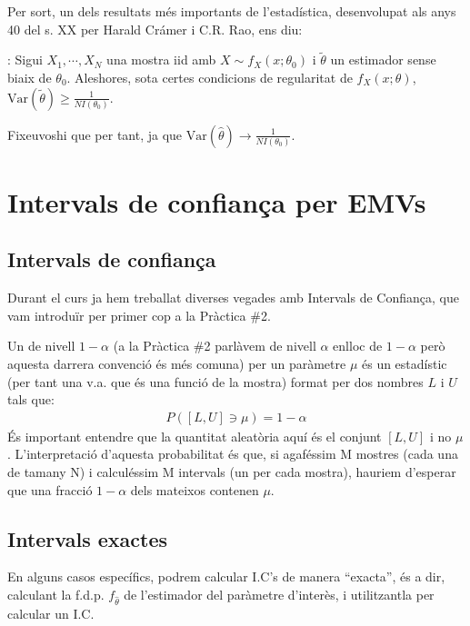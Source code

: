 \documentclass[letterpaper,10pt,english]{sphinxmanual}
\begin{document}
Per sort, un dels resultats més importants de l’estadística,
desenvolupat als anys 40 del s. XX per Harald Crámer i C.R. Rao,
ens diu:

: Sigui \(X_1, \cdots, X_N\) una mostra iid
amb \(X \sim f_X(x;\theta_0)\) i \(\tilde{\theta}\) un estimador
sense biaix de \(\theta_0\). Aleshores, sota certes condicions
de regularitat de \(f_X(x;\theta)\),
\(\mbox{Var}(\tilde{\theta}) \geq \frac{1}{N I(\theta_0)}\).

Fixeu\sphinxhyphen{}vos\sphinxhyphen{}hi que per tant, 
ja que \(\mbox{Var}(\hat{\theta}) \to \frac{1}{N I(\theta_0)}\).


\section{Intervals de confiança per EMVs}
\label{\detokenize{0_Intro/0_3_Estimacio:intervals-de-confianca-per-emvs}}

\subsection{Intervals de confiança}
\label{\detokenize{0_Intro/0_3_Estimacio:intervals-de-confianca}}
Durant el curs ja hem treballat diverses vegades amb Intervals de Confiança,
que vam introduïr per primer cop a la Pràctica \#2.

Un  de nivell \(1-\alpha\) (a la Pràctica \#2
parlàvem de nivell \(\alpha\) enlloc de \(1-\alpha\) però aquesta darrera convenció
és més comuna) per un paràmetre \(\mu\) és un estadístic
(per tant una v.a. que és una funció de la mostra)
format per dos nombres \(L\) i \(U\) tals que:
\begin{equation*}
\begin{split}P([L, U] \ni \mu) = 1 - \alpha\end{split}
\end{equation*}
És important entendre que la quantitat aleatòria aquí és el conjunt \([L, U]\)
i no \(\mu\). L’interpretació d’aquesta probabilitat és que, si agaféssim M mostres
(cada una de tamany N) i calculéssim M intervals (un per cada mostra), hauriem
d’esperar que una fracció \(1 - \alpha\) dels mateixos contenen \(\mu\).


\subsection{Intervals exactes}
\label{\detokenize{0_Intro/0_3_Estimacio:intervals-exactes}}
En alguns casos específics, podrem calcular I.C’s de manera “exacta”,
és a dir, calculant la f.d.p. \(f_{\hat{\theta}}\) de l’estimador
del paràmetre d’interès, i utilitzant\sphinxhyphen{}la per calcular un I.C.
\end{document}
